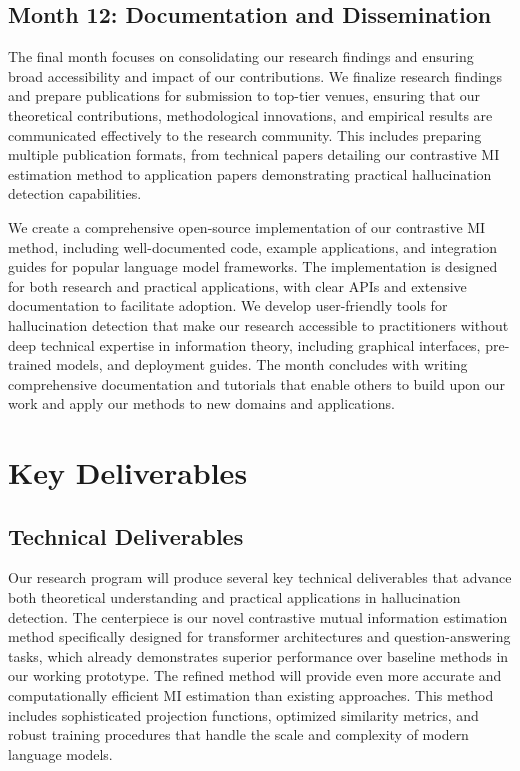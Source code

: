 \documentclass[11pt, oneside]{book}
\theoremstyle{plain}
\theoremstyle{definition}
\theoremstyle{remark}
\begin{document}
\subsection{Month 12: Documentation and Dissemination}

The final month focuses on consolidating our research findings and ensuring broad accessibility and impact of our contributions. We finalize research findings and prepare publications for submission to top-tier venues, ensuring that our theoretical contributions, methodological innovations, and empirical results are communicated effectively to the research community. This includes preparing multiple publication formats, from technical papers detailing our contrastive MI estimation method to application papers demonstrating practical hallucination detection capabilities.

We create a comprehensive open-source implementation of our contrastive MI method, including well-documented code, example applications, and integration guides for popular language model frameworks. The implementation is designed for both research and practical applications, with clear APIs and extensive documentation to facilitate adoption. We develop user-friendly tools for hallucination detection that make our research accessible to practitioners without deep technical expertise in information theory, including graphical interfaces, pre-trained models, and deployment guides. The month concludes with writing comprehensive documentation and tutorials that enable others to build upon our work and apply our methods to new domains and applications.

\section{Key Deliverables}

\subsection{Technical Deliverables}

Our research program will produce several key technical deliverables that advance both theoretical understanding and practical applications in hallucination detection. The centerpiece is our novel contrastive mutual information estimation method specifically designed for transformer architectures and question-answering tasks, which already demonstrates superior performance over baseline methods in our working prototype. The refined method will provide even more accurate and computationally efficient MI estimation than existing approaches. This method includes sophisticated projection functions, optimized similarity metrics, and robust training procedures that handle the scale and complexity of modern language models.
\end{document}
